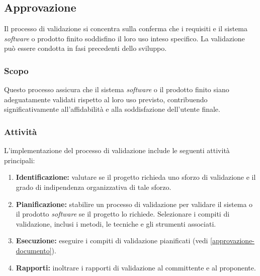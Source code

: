 \subsection{Approvazione}

Il processo di validazione si concentra sulla conferma che i requisiti e il
sistema \textit{software} o prodotto finito soddisfino il loro uso inteso
specifico. La validazione può essere condotta in fasi precedenti dello sviluppo.

\subsubsection{Scopo}

Questo processo assicura che il sistema \textit{software} o il prodotto finito
siano adeguatamente validati rispetto al loro uso previsto, contribuendo
significativamente all'affidabilità e alla soddisfazione dell'utente finale.

\subsubsection{Attività}
L'implementazione del processo di validazione include le seguenti attività
principali:

\begin{enumerate}
	\item \textbf{Identificazione:} valutare se il progetto richieda uno sforzo
	      di validazione e il grado di indipendenza organizzativa di tale
	      sforzo.
	\item \textbf{Pianificazione:} stabilire un processo di validazione per
	      validare il sistema o il prodotto \textit{software} se il progetto lo
	      richiede. Selezionare i compiti di validazione, inclusi i metodi, le
	      tecniche e gli strumenti associati.
	\item \textbf{Esecuzione:} eseguire i compiti di validazione pianificati
	      (vedi \cref{approvazione-documento}).
	\item \textbf{Rapporti:} inoltrare i rapporti di validazione al committente
	      e al proponente.
\end{enumerate}
